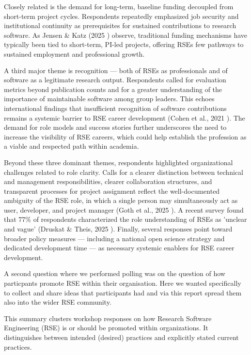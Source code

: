 \documentclass{eceasst}
\begin{document}
Closely related is the demand for long-term, baseline funding decoupled from short-term project cycles. Respondents repeatedly emphasized job security and institutional continuity as prerequisites for sustained contributions to research software. As Jensen \& Katz (2025 \cite{Jensen:2025c}) observe, traditional funding mechanisms have typically been tied to short-term, PI-led projects, offering RSEs few pathways to sustained employment and professional growth.

A third major theme is recognition — both of RSEs as professionals and of software as a legitimate research output. Respondents called for evaluation metrics beyond publication counts and for a greater understanding of the importance of maintainable software among group leaders. This echoes international findings that insufficient recognition of software contributions remains a systemic barrier to RSE career development (Cohen et al., 2021 \cite{Cohen:2021}). The demand for role models and success stories further underscores the need to increase the visibility of RSE careers, which could help establish the profession as a viable and respected path within academia.

Beyond these three dominant themes, respondents highlighted organizational challenges related to role clarity. Calls for a clearer distinction between technical and management responsibilities, clearer collaboration structures, and transparent processes for project assignment reflect the well-documented ambiguity of the RSE role, in which a single person may simultaneously act as user, developer, and project manager (Goth et al., 2025 \cite{Goth:2025}). A recent survey found that 77\% of respondents characterized the role understanding of RSEs as 'unclear and vague' (Druskat \& Theis, 2025 \cite{Druskat:2025a}). Finally, several responses point toward broader policy measures — including a national open science strategy and dedicated development time — as necessary systemic enablers for RSE career development.

A second question where we performed polling was on the question of how particpants promote RSE within their organisation.
Here we wanted specifically to collect and share ideas that participants had and via this report spread them also into the wider RSE community.



This summary clusters workshop responses on how Research Software Engineering (RSE) is or should be promoted within organizations. It distinguishes between intended (desired) practices and explicitly stated current practices.
\end{document}
